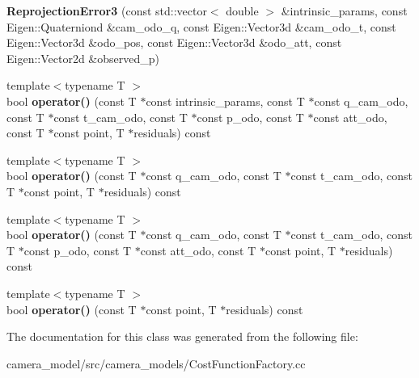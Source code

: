 \begin{DoxyCompactItemize}
\item 
\mbox{\label{classcamodocal_1_1ReprojectionError3_ab3aec67c62b64e92fa23a9b3897261e5}} 
{\bfseries Reprojection\+Error3} (const std\+::vector$<$ double $>$ \&intrinsic\+\_\+params, const Eigen\+::\+Quaterniond \&cam\+\_\+odo\+\_\+q, const Eigen\+::\+Vector3d \&cam\+\_\+odo\+\_\+t, const Eigen\+::\+Vector3d \&odo\+\_\+pos, const Eigen\+::\+Vector3d \&odo\+\_\+att, const Eigen\+::\+Vector2d \&observed\+\_\+p)
\item 
\mbox{\label{classcamodocal_1_1ReprojectionError3_a6d2dce3dd857ce6238ae0c19bdd56ca9}} 
{\footnotesize template$<$typename T $>$ }\\bool {\bfseries operator()} (const T $\ast$const intrinsic\+\_\+params, const T $\ast$const q\+\_\+cam\+\_\+odo, const T $\ast$const t\+\_\+cam\+\_\+odo, const T $\ast$const p\+\_\+odo, const T $\ast$const att\+\_\+odo, const T $\ast$const point, T $\ast$residuals) const
\item 
\mbox{\label{classcamodocal_1_1ReprojectionError3_a2de354fcca86a2daa443637d6a012e66}} 
{\footnotesize template$<$typename T $>$ }\\bool {\bfseries operator()} (const T $\ast$const q\+\_\+cam\+\_\+odo, const T $\ast$const t\+\_\+cam\+\_\+odo, const T $\ast$const point, T $\ast$residuals) const
\item 
\mbox{\label{classcamodocal_1_1ReprojectionError3_af24e180b9b7c18010d24d5de374daa82}} 
{\footnotesize template$<$typename T $>$ }\\bool {\bfseries operator()} (const T $\ast$const q\+\_\+cam\+\_\+odo, const T $\ast$const t\+\_\+cam\+\_\+odo, const T $\ast$const p\+\_\+odo, const T $\ast$const att\+\_\+odo, const T $\ast$const point, T $\ast$residuals) const
\item 
\mbox{\label{classcamodocal_1_1ReprojectionError3_aba0b51235cde51aa8b4cf20a57d44b44}} 
{\footnotesize template$<$typename T $>$ }\\bool {\bfseries operator()} (const T $\ast$const point, T $\ast$residuals) const
\end{DoxyCompactItemize}


The documentation for this class was generated from the following file\+:\begin{DoxyCompactItemize}
\item 
camera\+\_\+model/src/camera\+\_\+models/Cost\+Function\+Factory.\+cc\end{DoxyCompactItemize}
